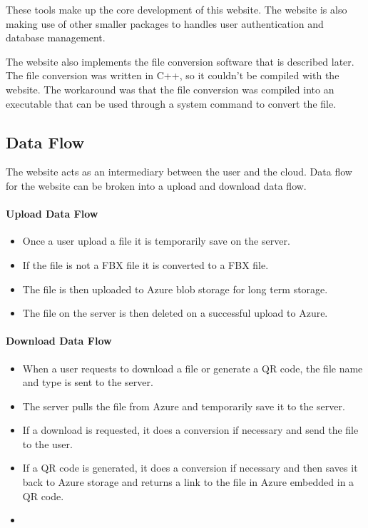    These tools make up the core development of this website. The website is also
    making use of other smaller packages to handles user authentication and database management.

    The website also implements the file conversion software that is described later.
    The file conversion was written in C++, so it couldn't be compiled with the website.
    The workaround was that the file conversion was compiled into an executable that can be used through a system command to convert the file.


    \subsection{Data Flow}
    The website acts as an intermediary between the user and the cloud. Data flow for the website can be broken into a upload and download data flow.

    \paragraph{Upload Data Flow}
    \begin{itemize}
        \item Once a user upload a file it is temporarily save on the server.
        \item If the file is not a FBX file it is converted to a FBX file.
        \item The file is then uploaded to Azure blob storage for long term storage.
        \item The file on the server is then deleted on a successful upload to Azure.
    \end{itemize}

    \paragraph{Download Data Flow}
    \begin{itemize}
        \item When a user requests to download a file or generate a QR code, the file name and type is sent to the server.
        \item The server pulls the file from Azure and temporarily save it to the server.
        \item If a download is requested, it does a conversion if necessary and send the file to the user.
        \item If a QR code is generated, it does a conversion if necessary and then saves it back to Azure storage and returns a link to the file in Azure embedded in a QR code.
        \item 
    \end{itemize}


